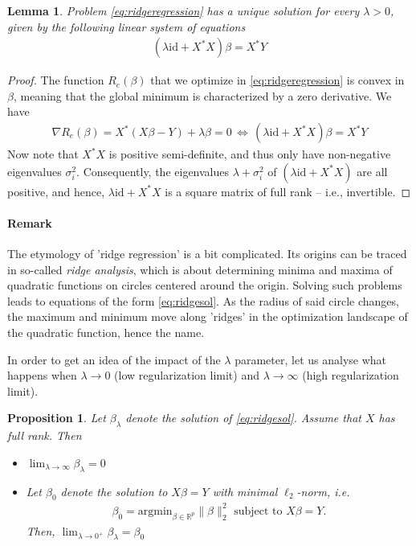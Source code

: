 \documentclass{article}
\newcommand{\id}{\mathrm{id}}
\newcommand{\R}{\mathbb{R}}
\newtheorem{lemma}{Lemma}
\newtheorem{prop}{Proposition}
\begin{document}
\begin{lemma}
    Problem \ref{eq:ridgeregression} has a unique solution for every $\lambda>0$, given by the following linear system of equations
    \begin{align}
        (\lambda \id + X^*X)\beta = X^*Y \label{eq:ridgesol}
    \end{align}
\end{lemma}
\begin{proof} The function $R_e(\beta)$ that we optimize in \eqref{eq:ridgeregression} is convex in $\beta$, meaning that the global minimum is characterized by a zero derivative. We have
\begin{align*}
    \nabla R_e(\beta) = X^*(X\beta-Y) + \lambda \beta = 0 \, \Leftrightarrow \, (\lambda \id + X^*X)\beta = X^*Y
\end{align*}
Now note that $X^*X$ is positive semi-definite, and thus only have non-negative eigenvalues $\sigma_i^2$. Consequently, the eigenvalues $\lambda + \sigma_i^2$ of $(\lambda\id + X^*X)$ are all positive, and hence, $\lambda \id + X^*X$ is a square matrix of full rank -- i.e., invertible.
\end{proof}

\paragraph{Remark} The etymology of 'ridge regression' is a bit complicated. Its origins can be traced in so-called \emph{ridge analysis}, which  is about determining minima and maxima of quadratic functions on circles centered around the origin. Solving such problems leads to equations of the form \eqref{eq:ridgesol}. As the radius of said circle changes, the maximum and minimum move along 'ridges' in the optimization landscape of the quadratic function, hence the name. \cite{hoerl2020ridge}

In order to get an idea of the impact of the $\lambda$ parameter, let us analyse what happens when $\lambda\to 0$ (low regularization limit) and $\lambda \to \infty$ (high regularization limit).

\begin{prop}
    Let $\beta_\lambda$ denote the solution of \eqref{eq:ridgesol}. Assume that $X$ has full rank. Then
    \begin{itemize}
        \item $\lim_{\lambda \to \infty} \beta_\lambda = 0$
        \item  Let $\beta_0$ denote the solution to $X\beta =Y$ with minimal $\ell_2$-norm, i.e. 
        \begin{align*}
            \beta_0 = \mathrm{argmin}_{\beta\in \R^p} \|\beta\|_2^2 \text{ subject to  } X\beta=Y.     
        \end{align*}
        Then, $\lim_{\lambda \to 0^+} \beta_\lambda=\beta_0$
    \end{itemize}
\end{prop}
\end{document}
